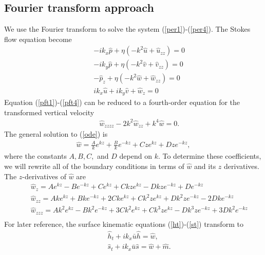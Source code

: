 \documentclass[paper=a4, fontsize=11pt]{article} %
\begin{document}
\subsection{Fourier transform approach}
We use the Fourier transform to solve the system (\ref{per1})-(\ref{per4}).
The Stokes flow equation become
\begin{eqnarray}
&&-ik_x\widehat{p} + \eta ( -k^2\widehat{u} + \widehat{u}_{zz}) = 0 \label{pft1} \\
&&-ik_y\widehat{p} + \eta ( -k^2\widehat{v} + \widehat{v}_{zz}) = 0 \\
&&-\widehat{p}_z + \eta (-k^2\widehat{w} + \widehat{w}_{zz}) = 0 \\
&&ik_x\widehat{u} + ik_y\widehat{v} + \widehat{w}_z = 0 \label{pft4}
\end{eqnarray}
Equation (\ref{pft1})-(\ref{pft4}) can be reduced to a fourth-order equation for the transformed vertical velocity
\begin{eqnarray}
&&\widehat{w}_{zzzz} - 2k^2 \widehat{w}_{zz} + k^4 \widehat{w}=0. \label{ode}
\end{eqnarray}
The general solution to (\ref{ode}) is
\begin{eqnarray}
\widehat{w} = \frac{A}{k}e^{k z} + \frac{B}{k}e^{-k z} + {C}ze^{k z}+ {D}ze^{-k z},\label{wformula}
\end{eqnarray}
where the constants $A,B,C,$ and $D$ depend on $k$.
To determine these coefficients, we will rewrite all of the boundary
conditions in terms of $\widehat{w}$ and its $z$ derivatives.
The $z$-derivatives of $\widehat{w}$ are
\begin{eqnarray}
&&\widehat{w}_{z} = {A}e^{k z} - {B}e^{-k z} + {C}e^{k z} + {C}kze^{k z} - {D}kze^{-k z} + {D}e^{-k z} \nonumber \\
&&\widehat{w}_{zz} = {Ak}e^{k z} + {Bk}e^{-k z} + {2Ck}e^{k z} + {C}k^2 ze^{k z} + {D}k^2ze^{-k z} - {2Dk}e^{-k z} \nonumber\\
&&\widehat{w}_{zzz} = {Ak^2}e^{k z} - {Bk^2}e^{-k z} + {3Ck^2}e^{k z} + {C}k^3 ze^{k z} - {D}k^3ze^{-k z} + {3Dk^2}e^{-k z}\nonumber \\ \label{wzzz}
\end{eqnarray}
For later reference,
the surface kinematic equations (\ref{ht})-(\ref{st}) transform to
\begin{eqnarray}
&&\widehat{h}_t + ik_x \bar{u}  \widehat{h} = \widehat{w},\label{hthat}\\
&&\widehat{s}_t +  ik_x \bar{u} \widehat{s} = \widehat{w}+\widehat{m}.\label{sthat}
\end{eqnarray}
\end{document}
